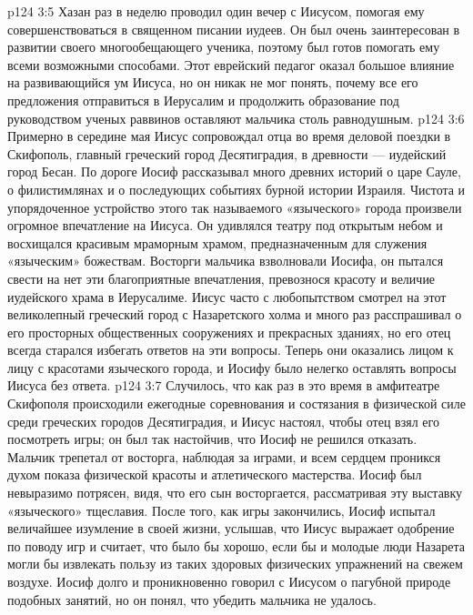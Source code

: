 \vs p124 3:5 Хазан раз в неделю проводил один вечер с Иисусом, помогая ему совершенствоваться в священном писании иудеев. Он был очень заинтересован в развитии своего многообещающего ученика, поэтому был готов помогать ему всеми возможными способами. Этот еврейский педагог оказал большое влияние на развивающийся ум Иисуса, но он никак не мог понять, почему все его предложения отправиться в Иерусалим и продолжить образование под руководством ученых раввинов оставляют мальчика столь равнодушным.
\vs p124 3:6 \pc Примерно в середине мая Иисус сопровождал отца во время деловой поездки в Скифополь, главный греческий город Десятиградия, в древности --- иудейский город Бесан. По дороге Иосиф рассказывал много древних историй о царе Сауле, о филистимлянах и о последующих событиях бурной истории Израиля. Чистота и упорядоченное устройство этого так называемого «языческого» города произвели огромное впечатление на Иисуса. Он удивлялся театру под открытым небом и восхищался красивым мраморным храмом, предназначенным для служения «языческим» божествам. Восторги мальчика взволновали Иосифа, он пытался свести на нет эти благоприятные впечатления, превознося красоту и величие иудейского храма в Иерусалиме. Иисус часто с любопытством смотрел на этот великолепный греческий город с Назаретского холма и много раз расспрашивал о его просторных общественных сооружениях и прекрасных зданиях, но его отец всегда старался избегать ответов на эти вопросы. Теперь они оказались лицом к лицу с красотами языческого города, и Иосифу было нелегко оставлять вопросы Иисуса без ответа.
\vs p124 3:7 Случилось, что как раз в это время в амфитеатре Скифополя происходили ежегодные соревнования и состязания в физической силе среди греческих городов Десятиградия, и Иисус настоял, чтобы отец взял его посмотреть игры; он был так настойчив, что Иосиф не решился отказать. Мальчик трепетал от восторга, наблюдая за играми, и всем сердцем проникся духом показа физической красоты и атлетического мастерства. Иосиф был невыразимо потрясен, видя, что его сын восторгается, рассматривая эту выставку «языческого» тщеславия. После того, как игры закончились, Иосиф испытал величайшее изумление в своей жизни, услышав, что Иисус выражает одобрение по поводу игр и считает, что было бы хорошо, если бы и молодые люди Назарета могли бы извлекать пользу из таких здоровых физических упражнений на свежем воздухе. Иосиф долго и проникновенно говорил с Иисусом о пагубной природе подобных занятий, но он понял, что убедить мальчика не удалось.
